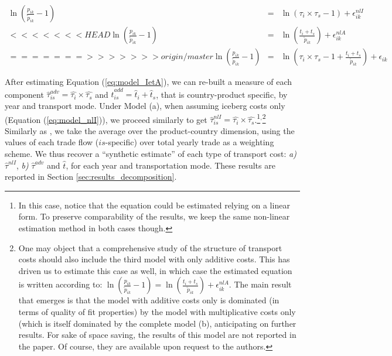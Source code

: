 \documentclass[a4paper,11pt]{article}
\begin{document}
\begin{eqnarray}
\ln\left(\frac{p_{ik}}{\widetilde{p}_{ik}}-1 \right)&=& \ln \left(\tau_{i}\times\tau_{s}-1 \right) + \epsilon^{nlI}_{ik} \label{eq:model_nlI} \\
<<<<<<< HEAD
\ln\left(\frac{p_{ik}}{\widetilde{p}_{ik}}-1 \right)&=& \ln \left(\frac{t_{i} + t_{s}}{\widetilde{p}_{ik}}\right) + \epsilon^{nlA}_{ik} \label{eq:model_nlA} \\
=======
>>>>>>> origin/master
\ln\left(\frac{p_{ik}}{\widetilde{p}_{ik}}-1 \right)&=& \ln \left(\tau_{i} \times \tau_{s}-1 +\frac{t_{i} + t_{s}}{\widetilde{p}_{ik}}\right) + \epsilon_{ik} \label{eq:model_IetA}
\end{eqnarray}

After estimating Equation (\ref{eq:model_IetA}), we can re-built a measure of each component $\widehat{\tau}^{adv}_{is} = \widehat{\tau_{i}} \times \widehat{\tau_{s}}$ and $\widehat{t}^{add}_{is} = \widehat{t}_{i} + \widehat{t}_{s}$, that is country-product specific, by year and transport mode. Under Model (a), when assuming iceberg costs only (Equation (\ref{eq:model_nlI})), we proceed similarly to get $\widehat{\tau}^{nlI}_{is} = \widehat{\tau_{i}} \times \widehat{\tau_{s}}$.\footnote{In this case, notice that the equation could be estimated relying on a linear form. To preserve comparability of the results, we keep the same non-linear estimation method in both cases though.}$^{,}$\footnote{One may object that a comprehensive study of the structure of transport costs should also include the third model with only additive costs. This has driven us to estimate this case as well, in which case the estimated equation is written according to: $\ln\left(\frac{p_{ik}}{\widetilde{p}_{ik}}-1 \right)= \ln \left(\frac{t_{i} + t_{s}}{\widetilde{p}_{ik}}\right) + \epsilon^{nlA}_{ik}$. The main result that emerges is that the model with additive costs only is dominated (in terms of quality of fit properties) by the model with multiplicative costs only (which is itself dominated by the complete model (b), anticipating on further results. For sake of space saving, the results of this model are not reported in the paper. Of course, they are available upon request to the authors.} Similarly as \citet{Irrazabal_2015}, we take the average over the product-country dimension, using the values of each trade flow ($is$-specific) over total yearly trade as a weighting scheme. We thus recover a ``synthetic estimate'' of each type of transport cost: \textit{a)} $\widehat{\tau}^{nlI}$, \textit{b)} $\widehat{\tau}^{adv}$ and $\widehat{t}$, for each year and transportation mode. These results are reported in Section \ref{sec:results_decomposition}.
\end{document}

